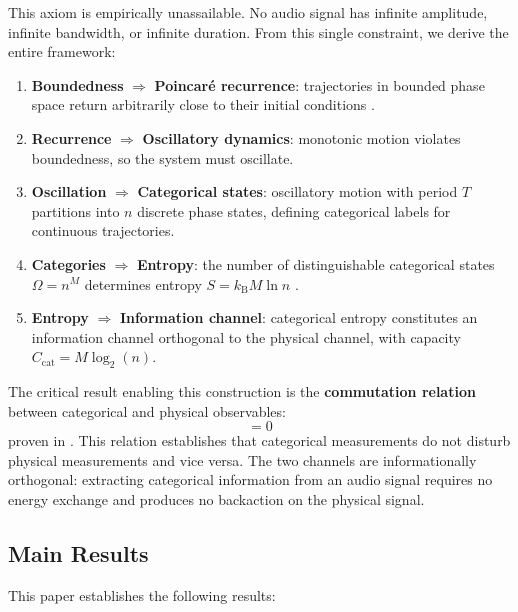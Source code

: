 \documentclass[twocolumn,10pt]{article}
\theoremstyle{remark}
\newcommand{\kB}{k_{\mathrm{B}}}
\newcommand{\Ocat}{\hat{O}_{\mathrm{cat}}}
\newcommand{\Ophys}{\hat{O}_{\mathrm{phys}}}
\newcommand{\Ccat}{C_{\mathrm{cat}}}
\begin{document}
This axiom is empirically unassailable. No audio signal has infinite amplitude, infinite bandwidth, or infinite duration. From this single constraint, we derive the entire framework:

\begin{enumerate}
    \item \textbf{Boundedness} $\Rightarrow$ \textbf{Poincar\'{e} recurrence}: trajectories in bounded phase space return arbitrarily close to their initial conditions \cite{poincare1890}.

    \item \textbf{Recurrence} $\Rightarrow$ \textbf{Oscillatory dynamics}: monotonic motion violates boundedness, so the system must oscillate.

    \item \textbf{Oscillation} $\Rightarrow$ \textbf{Categorical states}: oscillatory motion with period $T$ partitions into $n$ discrete phase states, defining categorical labels for continuous trajectories.

    \item \textbf{Categories} $\Rightarrow$ \textbf{Entropy}: the number of distinguishable categorical states $\Omega = n^M$ determines entropy $S = \kB M \ln n$ \cite{sachikonye2026counting}.

    \item \textbf{Entropy} $\Rightarrow$ \textbf{Information channel}: categorical entropy constitutes an information channel orthogonal to the physical channel, with capacity $\Ccat = M \log_2(n)$.
\end{enumerate}

The critical result enabling this construction is the \textbf{commutation relation} between categorical and physical observables:
\begin{equation}
    [\Ocat, \Ophys] = 0
    \label{eq:commutation}
\end{equation}
proven in \cite{sachikonye2026counting}. This relation establishes that categorical measurements do not disturb physical measurements and vice versa. The two channels are informationally orthogonal: extracting categorical information from an audio signal requires no energy exchange and produces no backaction on the physical signal.

\subsection{Main Results}

This paper establishes the following results:
\end{document}
